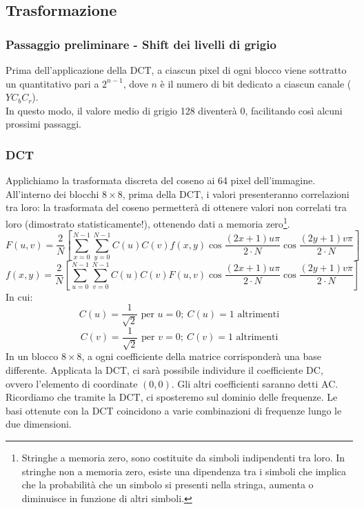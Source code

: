 \documentclass{report}
\begin{document}
	\subsection{Trasformazione}
	\subsubsection{Passaggio preliminare - Shift dei livelli di grigio}
	Prima dell'applicazione della DCT, a ciascun pixel di ogni blocco viene sottratto un quantitativo pari a $2^{n-1}$, dove $n$ è il numero di bit dedicato a ciascun canale ($YC_bC_r$).\\
	In questo modo, il valore medio di grigio 128 diventerà 0, facilitando così alcuni prossimi passaggi.
	
	\newpage
	
	\subsubsection{DCT}
	Applichiamo la trasformata discreta del coseno ai 64 pixel dell'immagine.\\
	All'interno dei blocchi $8\times 8$, prima della DCT, i valori presenteranno correlazioni tra loro: la trasformata del coseno permetterà di ottenere valori non correlati tra loro (dimostrato statisticamente!), ottenendo dati a memoria zero\footnote{Stringhe a memoria zero, sono costituite da simboli indipendenti tra loro.
	In stringhe non a memoria zero, esiste una dipendenza tra i simboli che implica che la probabilità che un simbolo si presenti nella stringa, aumenta o diminuisce in funzione di altri simboli.}.
	$$
	F(u,v) = \frac{2}{N}\left[\sum^{N-1}_{x=0}\sum^{N-1}_{y=0}C(u)C(v)f(x,y)\cos\frac{(2x+1)u\pi}{2\cdot N}\cos\frac{(2y+1)v\pi}{2\cdot N} \right]
	$$
	$$
	f(x,y) = \frac{2}{N}\left[\sum^{N-1}_{u=0}\sum^{N-1}_{v=0}C(u)C(v)F(u,v)\cos\frac{(2x+1)u\pi}{2\cdot N}\cos\frac{(2y+1)v\pi}{2\cdot N} \right]
	$$
	In cui:
	$$
	C(u) = \frac{1}{\sqrt{2}} \text{ per } u=0; \ C(u) = 1 \text{ altrimenti}
	$$
	$$
	C(v) = \frac{1}{\sqrt{2}} \text{ per } v=0; \ C(v) = 1 \text{ altrimenti}
	$$
	In un blocco $8 \times 8$, a ogni coefficiente della matrice corrisponderà una base differente.
	Applicata la DCT, ci sarà possibile individure il coefficiente DC, ovvero l'elemento di coordinate $(0,0)$. Gli altri coefficienti saranno detti AC.\\
	Ricordiamo che tramite la DCT, ci sposteremo sul dominio delle frequenze. Le basi ottenute con la DCT coincidono a varie combinazioni di frequenze lungo le due dimensioni.
\end{document}
